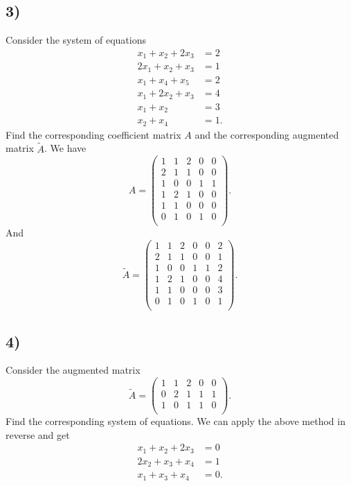 \subsection*{3)}
Consider the system of equations
\begin{align*}
  x_1 + x_2 + 2x_3 &= 2 \\
  2x_1 + x_2 + x_3 &= 1 \\
  x_1 + x_4 + x_5 &= 2 \\
  x_1 + 2x_2 + x_3 &= 4 \\
  x_1 + x_2 &= 3 \\
  x_2 + x_4 &= 1
.\end{align*}
Find the corresponding coefficient matrix $A$ and the corresponding augmented matrix $\tilde{A}$.
\bigbreak
We have
\[ 
A = \begin{pmatrix}
1 & 1 & 2 & 0 & 0\\
2 & 1 & 1 & 0 & 0\\
1 & 0 & 0 & 1 & 1\\
1 & 2 & 1 & 0 & 0\\
1 & 1 & 0 & 0 & 0\\
0 & 1 & 0 & 1 & 0\\
\end{pmatrix}
.\]
And
\[ 
  \tilde{A} = \left( \begin{array}{ccccc|c}
  1 & 1 & 2 & 0 & 0 & 2\\
  2 & 1 & 1 & 0 & 0 & 1\\
  1 & 0 & 0 & 1 & 1 & 2\\
  1 & 2 & 1 & 0 & 0 & 4\\
  1 & 1 & 0 & 0 & 0 & 3\\
  0 & 1 & 0 & 1 & 0 & 1\\
  \end{array} \right)
.\]



\subsection*{4)}
Consider the augmented matrix
\[ 
  \tilde{A} =
\left( \begin{array}{cccc|c}
1 & 1 & 2 & 0 & 0\\
0 & 2 & 1 & 1 & 1\\
1 & 0 & 1 & 1 & 0\\
\end{array} \right)
.\]
Find the corresponding system of equations.
\bigbreak
We can apply the above method in reverse and get
\begin{align*}
x_1 + x_2 + 2x_3 &= 0 \\
2x_2 + x_3 + x_4 &= 1 \\
x_1 + x_3 + x_4 &= 0
.\end{align*}


